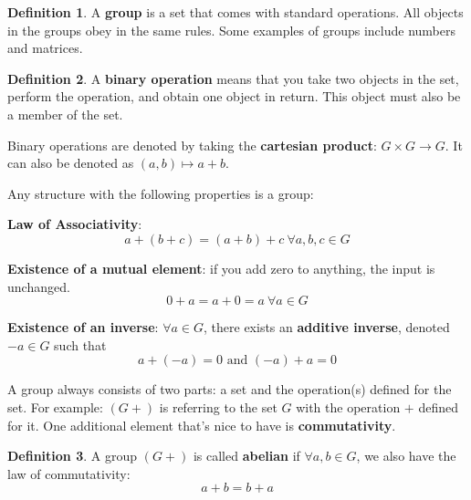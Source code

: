 \documentclass[a4paper, 12pt]{article}
\theoremstyle{definition}
\theoremstyle{definition}
\newtheorem{defn}{Definition}[section]
\theoremstyle{definition}
\theoremstyle{definition}
\newenvironment{enumerate_tight}{
	\begin{enumerate}
		\setlength{\itemsep}{0pt}
		\setlength{\parskip}{0pt}
	}{\end{enumerate}}
\newenvironment{itemize_tight}{
	\begin{itemize}
		\setlength{\itemsep}{0pt}
		\setlength{\parskip}{0pt}
	}{\end{itemize}}
\begin{document}
{\begin{defn}
	A \textbf{group} is a set that comes with standard operations. All objects in the groups obey in the same rules. Some examples of groups include numbers and matrices. 
\end{defn}
\begin{defn}
	A \textbf{binary operation} means that you take two objects in the set, perform the operation, and obtain one object in return. This object must also be a member of the set.
\end{defn}
\begin{itemize_tight}
	\item Binary operations are denoted by taking the \textbf{cartesian product}: $G \times G \rightarrow G$. It can also be denoted as $(a,b) \mapsto a +b$. 
	\item Any structure with the following properties is a group: 
	\begin{enumerate_tight}
		\item \textbf{Law of Associativity}: $$ a + (b+c) = (a+b) + c\ \forall a,b,c \in G$$ 
		\item \textbf{Existence of a mutual element}: if you add zero to anything, the input is unchanged. $$ 0 + a = a + 0 = a\ \forall a \in G$$ 
		\item \textbf{Existence of an inverse}: $\forall a \in G$, there exists an \textbf{additive inverse}, denoted $-a \in G$ such that $$ a + (-a) = 0 \mbox{ and } (-a) + a = 0 $$ 
	\end{enumerate_tight}
\end{itemize_tight}
A group always consists of two parts: a set and the operation(s) defined for the set. For example: $(G + )$ is referring to the set $G$ with the operation $+$ defined for it. 
One additional element that's nice to have is \textbf{commutativity}. 
\begin{defn}
	A group $(G+)$ is called \textbf{abelian} if $\forall a,b \in G$, we also have the law of commutativity: 
	$$ a + b = b + a$$ 	
\end{defn}

}
\end{document}
